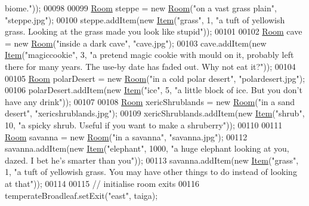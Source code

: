 \begin{DoxyCode}
{       biome."}));
00098 
00099         \hyperlink{classRoom}{Room} steppe = \textcolor{keyword}{new} \hyperlink{classRoom}{Room}(\textcolor{stringliteral}{"on a vast grass plain"}, \textcolor{stringliteral}{"steppe.jpg"});
00100         steppe.addItem(\textcolor{keyword}{new} \hyperlink{classItem}{Item}(\textcolor{stringliteral}{"grass"}, 1, \textcolor{stringliteral}{"a tuft of yellowish grass. Looking at the grass made you
       look like stupid"}));
00101 
00102         \hyperlink{classRoom}{Room} cave = \textcolor{keyword}{new} \hyperlink{classRoom}{Room}(\textcolor{stringliteral}{"inside a dark cave"}, \textcolor{stringliteral}{"cave.jpg"});
00103         cave.addItem(\textcolor{keyword}{new} \hyperlink{classItem}{Item}(\textcolor{stringliteral}{"magiccookie"}, 3, \textcolor{stringliteral}{"a pretend magic cookie with mould on it, probably left
       there for many years. The use-by date has faded out. Why not eat it?"}));
00104 
00105         \hyperlink{classRoom}{Room} polarDesert = \textcolor{keyword}{new} \hyperlink{classRoom}{Room}(\textcolor{stringliteral}{"in a cold polar desert"}, \textcolor{stringliteral}{"polardesert.jpg"});
00106         polarDesert.addItem(\textcolor{keyword}{new} \hyperlink{classItem}{Item}(\textcolor{stringliteral}{"ice"}, 5, \textcolor{stringliteral}{"a little block of ice. But you don't have any drink"}));
00107 
00108         \hyperlink{classRoom}{Room} xericShrublands = \textcolor{keyword}{new} \hyperlink{classRoom}{Room}(\textcolor{stringliteral}{"in a sand desert"}, \textcolor{stringliteral}{"xericshrublands.jpg"});
00109         xericShrublands.addItem(\textcolor{keyword}{new} \hyperlink{classItem}{Item}(\textcolor{stringliteral}{"shrub"}, 10, \textcolor{stringliteral}{"a spicky shrub. Useful if you want to make a
       shruberry"}));
00110 
00111         \hyperlink{classRoom}{Room} savanna = \textcolor{keyword}{new} \hyperlink{classRoom}{Room}(\textcolor{stringliteral}{"in a savanna"}, \textcolor{stringliteral}{"savanna.jpg"});
00112         savanna.addItem(\textcolor{keyword}{new} \hyperlink{classItem}{Item}(\textcolor{stringliteral}{"elephant"}, 1000, \textcolor{stringliteral}{"a huge elephant looking at you, dazed. I bet he's
       smarter than you"}));
00113         savanna.addItem(\textcolor{keyword}{new} \hyperlink{classItem}{Item}(\textcolor{stringliteral}{"grass"}, 1, \textcolor{stringliteral}{"a tuft of yellowish grass. You may have other things to
       do instead of looking at that"}));
00114 
00115         \textcolor{comment}{// initialise room exits}
00116         temperateBroadleaf.setExit(\textcolor{stringliteral}{"east"}, taiga);

\end{DoxyCode}

